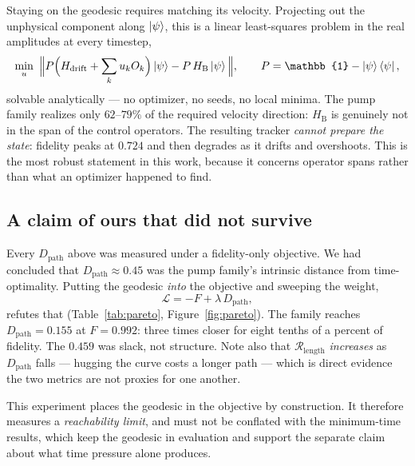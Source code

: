 \documentclass[10pt]{article}
\newcommand{\Dpath}{D_{\mathrm{path}}}
\newcommand{\Rlen}{\mathcal{R}_{\mathrm{length}}}
\newcommand{\HB}{H_{\mathrm{B}}}
\begin{document}
Staying on the geodesic requires matching its velocity. Projecting out the
unphysical component along $\ket{\psi}$, this is a linear least-squares problem in
the real amplitudes at every timestep,
\begin{equation}
\min_{u}\ \Big\| P\Big(H_{\mathrm{drift}}+\sum_k u_k O_k\Big)\ket{\psi}
 - P\,\HB\ket{\psi} \Big\|,
\qquad P = \mathbb{1}-\ket{\psi}\bra{\psi},
\label{eq:ls}
\end{equation}
solvable analytically --- no optimizer, no seeds, no local minima. The pump family
realizes only $62$--$79\%$ of the required velocity direction: $\HB$ is genuinely
not in the span of the control operators. The resulting tracker \emph{cannot
prepare the state}: fidelity peaks at $0.724$ and then degrades as it drifts and
overshoots. This is the most robust statement in this work, because it concerns
operator spans rather than what an optimizer happened to find.

\subsection{A claim of ours that did not survive}
\label{sec:pareto}

Every $\Dpath$ above was measured under a fidelity-only objective. We had
concluded that $\Dpath\approx0.45$ was the pump family's intrinsic distance from
time-optimality. Putting the geodesic \emph{into} the objective and sweeping the
weight,
\begin{equation}
\mathcal{L} = -F + \lambda\,\Dpath,
\end{equation}
refutes that (Table~\ref{tab:pareto}, Figure~\ref{fig:pareto}). The family reaches
$\Dpath=0.155$ at $F=0.992$: three times closer for eight tenths of a percent of
fidelity. The $0.459$ was slack, not structure. Note also that $\Rlen$
\emph{increases} as $\Dpath$ falls --- hugging the curve costs a longer path ---
which is direct evidence the two metrics are not proxies for one another.

This experiment places the geodesic in the objective by construction. It therefore
measures a \emph{reachability limit}, and must not be conflated with the
minimum-time results, which keep the geodesic in evaluation and support the
separate claim about what time pressure alone produces.
\end{document}
